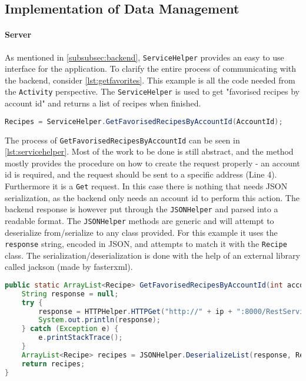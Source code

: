 \subsection{Implementation of Data Management}
\label{subsec:datamanagement}

\paragraph{Server}
As mentioned in \ref{subsubsec:backend}, \texttt{ServiceHelper} provides an easy to use interface for the application. To clarify the entire process of communicating with the backend, consider \ref{lst:getfavorites}. This example is all the code needed from the \texttt{Activity} perspective. The \texttt{ServiceHelper} is used to get "favorised recipes by account id" and returns a list of recipes when finished.

\begin{lstlisting}[language=java, label={lst:getfavorites}, caption={Sending a backend request from an Activity}]
Recipes = ServiceHelper.GetFavorisedRecipesByAccountId(AccountId);
\end{lstlisting}

The process of \texttt{GetFavorisedRecipesByAccountId} can be seen in \ref{lst:servicehelper}. Most of the work to be done is still abstract, and the method mostly provides the procedure on how to create the request properly - an account id is required, and the request should be sent to a specific address (Line 4). Furthermore it is a \texttt{Get} request.
In this case there is nothing that needs JSON serialization, as the backend only needs an account id to perform this action. The backend response is however put through the \texttt{JSONHelper} and parsed into a readable format. The \texttt{JSONHelper} methods are generic and will attempt to deserialize from/serialize to any class provided. For this example it uses the \texttt{response} string, encoded in JSON, and attempts to match it with the \texttt{Recipe} class. The serialization/deserialization is done with the help of an external library called jackson (made by fasterxml)\cite{jackson}.

\begin{lstlisting}[language=java, label={lst:servicehelper}, caption={GetFavorisedRecipesByAccountId from ServiceHelper}]
public static ArrayList<Recipe> GetFavorisedRecipesByAccountId(int accountId){
    String response = null;
    try {
        response = HTTPHelper.HTTPGet("http://" + ip + ":8000/RestService/Favorises/GetFavorisedRecipesByAccountId?accountId=" + accountId);
        System.out.println(response);
    } catch (Exception e) {
        e.printStackTrace();
    }
    ArrayList<Recipe> recipes = JSONHelper.DeserializeList(response, Recipe.class);
    return recipes;
}
\end{lstlisting}

